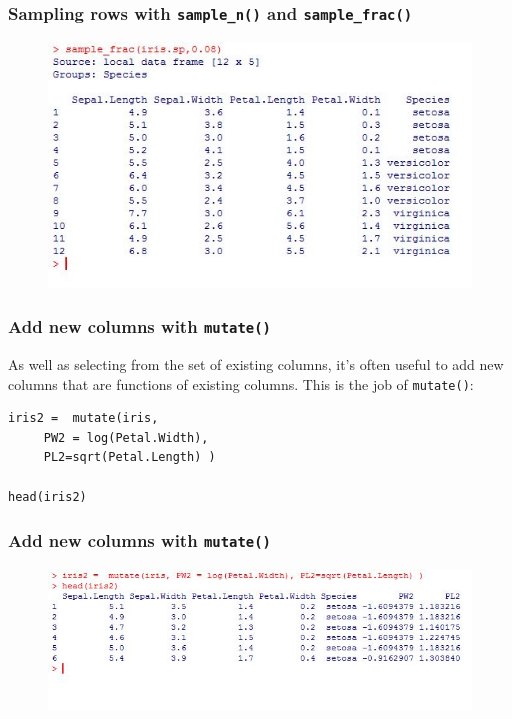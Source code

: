 \documentclass{beamer}
\begin{document}
\begin{frame}
	\frametitle{Sampling rows with \texttt{sample\_n()} and \texttt{sample\_frac()}}
	
	\begin{figure}
		\centering
		\includegraphics[width=1.07\linewidth]{irissample3}
	\end{figure}
	
\end{frame}
\begin{frame}[fragile]
\frametitle{Add new columns with \texttt{mutate()} }

As well as selecting from the set of existing columns, it’s often useful to add new columns that are functions of existing columns. This is the job of \texttt{mutate()}:

\begin{framed}
\begin{verbatim}
iris2 =  mutate(iris, 
     PW2 = log(Petal.Width), 
     PL2=sqrt(Petal.Length) )
     
head(iris2)
\end{verbatim}
\end{framed}
\end{frame}
\begin{frame}
	
	\frametitle{Add new columns with \texttt{mutate()} }
	\begin{figure}
\centering
\includegraphics[width=0.9\linewidth]{irismutate}

\end{figure}

\end{frame}
\end{document}
